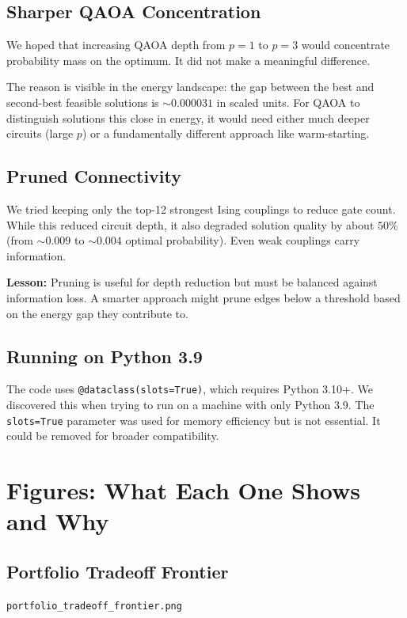 \documentclass[12pt, a4paper]{article}
\begin{document}
\subsection{Sharper QAOA Concentration}

We hoped that increasing QAOA depth from $p = 1$ to $p = 3$ would concentrate
probability mass on the optimum. It did not make a meaningful difference.

The reason is visible in the energy landscape: the gap between the best and
second-best feasible solutions is $\sim 0.000031$ in scaled units. For QAOA to
distinguish solutions this close in energy, it would need either much deeper
circuits (large $p$) or a fundamentally different approach like warm-starting.

\subsection{Pruned Connectivity}

We tried keeping only the top-12 strongest Ising couplings to reduce gate count.
While this reduced circuit depth, it also degraded solution quality by about
$50\%$ (from $\sim 0.009$ to $\sim 0.004$ optimal probability). Even weak
couplings carry information.

\textbf{Lesson:} Pruning is useful for depth reduction but must be balanced
against information loss. A smarter approach might prune edges below a threshold
based on the energy gap they contribute to.

\subsection{Running on Python 3.9}

The code uses \texttt{@dataclass(slots=True)}, which requires Python 3.10+.
We discovered this when trying to run on a machine with only Python 3.9. The
\texttt{slots=True} parameter was used for memory efficiency but is not
essential. It could be removed for broader compatibility.


\section{Figures: What Each One Shows and Why}

\subsection{Portfolio Tradeoff Frontier}
\texttt{portfolio\_tradeoff\_frontier.png}
\end{document}
